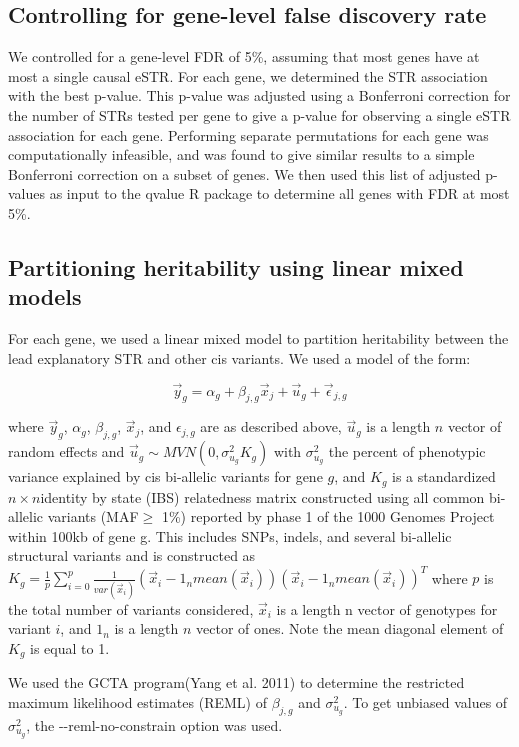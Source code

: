 \subsection{Controlling for gene-level false discovery rate}
We controlled for a gene-level FDR of 5\%, assuming that most genes have at most a single causal eSTR. For each gene, we determined the STR association with the best p-value. This p-value was adjusted using a Bonferroni correction for the number of STRs tested per gene to give a p-value for observing a single eSTR association for each gene. Performing separate permutations for each gene was computationally infeasible, and was found to give similar results to a simple Bonferroni correction on a subset of genes. We then used this list of adjusted p-values as input to the qvalue R package to determine all genes with FDR at most 5\%.

\subsection{Partitioning heritability using linear mixed models}
For each gene, we used a linear mixed model to partition heritability between the lead explanatory STR and other cis variants. We used a model of the form:

\begin{equation}
\vec{y}_g = \alpha_g + \beta_{j,g}\vec{x}_j + \vec{u}_g + \vec{\epsilon}_{j,g}
\end{equation}

where $\vec{y}_g$, $\alpha_g$, $\beta_{j,g}$, $\vec{x}_j$, and $\epsilon_{j,g}$ are as described above, $\vec{u}_g$ is a length $n$ vector of random effects and $\vec{u}_g \sim MVN(0, \sigma_{u_g}^2 K_g)$ with $\sigma_{u_g}^2$ the percent of phenotypic variance explained by cis bi-allelic variants for gene $g$, and $K_g$ is a standardized $n\times n $identity by state (IBS) relatedness matrix constructed using all common bi-allelic variants (MAF$\geq$ 1\%) reported by phase 1 of the 1000 Genomes Project within 100kb of gene g. This includes SNPs, indels, and several bi-allelic structural variants and is constructed as $K_g = \frac{1}{p} \sum_{i=0}^p \frac{1}{var(\vec{x}_i)}(\vec{x}_i - 1_nmean(\vec{x}_i))(\vec{x}_i-1_nmean(\vec{x}_i))^T$ where $p$ is the total number of variants considered, $\vec{x}_i$ is a length n vector of genotypes for variant $i$, and $1_n$ is a length $n$ vector of ones. Note the mean diagonal element of $K_g$ is equal to 1.

We used the GCTA program(Yang et al. 2011) to determine the restricted maximum likelihood estimates (REML) of $\beta_{j,g}$ and $\sigma_{u_g}^2$. To get unbiased values of $\sigma_{u_g}^2$, the -{}-reml-no-constrain option was used.

